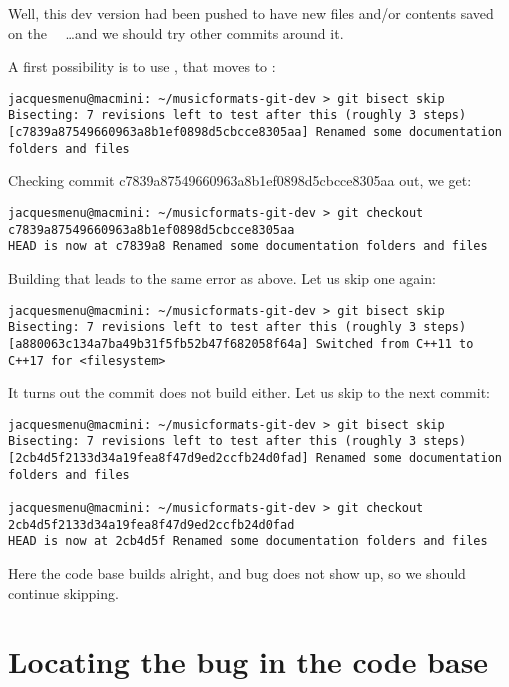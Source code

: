 Well, this dev version had been pushed to have new files and/or contents saved on the \mf\ \repo\ \dots and we should try other commits around it.

A first possibility is to use , that moves to :
\begin{lstlisting}[language=Terminal]
jacquesmenu@macmini: ~/musicformats-git-dev > git bisect skip
Bisecting: 7 revisions left to test after this (roughly 3 steps)
[c7839a87549660963a8b1ef0898d5cbcce8305aa] Renamed some documentation folders and files
\end{lstlisting}

Checking commit c7839a87549660963a8b1ef0898d5cbcce8305aa out, we get:
\begin{lstlisting}[language=Terminal]
jacquesmenu@macmini: ~/musicformats-git-dev > git checkout c7839a87549660963a8b1ef0898d5cbcce8305aa
HEAD is now at c7839a8 Renamed some documentation folders and files
\end{lstlisting}

Building that leads to the same error as above. Let us skip one again:
\begin{lstlisting}[language=Terminal]
jacquesmenu@macmini: ~/musicformats-git-dev > git bisect skip
Bisecting: 7 revisions left to test after this (roughly 3 steps)
[a880063c134a7ba49b31f5fb52b47f682058f64a] Switched from C++11 to C++17 for <filesystem>
\end{lstlisting}

It turns out the commit  does not build either. Let us skip to the next commit:
\begin{lstlisting}[language=Terminal]
jacquesmenu@macmini: ~/musicformats-git-dev > git bisect skip
Bisecting: 7 revisions left to test after this (roughly 3 steps)
[2cb4d5f2133d34a19fea8f47d9ed2ccfb24d0fad] Renamed some documentation folders and files

jacquesmenu@macmini: ~/musicformats-git-dev > git checkout 2cb4d5f2133d34a19fea8f47d9ed2ccfb24d0fad
HEAD is now at 2cb4d5f Renamed some documentation folders and files
\end{lstlisting}

Here the code base builds alright, and bug does not show up, so we should continue skipping.


\section{Locating the bug in the code base}

